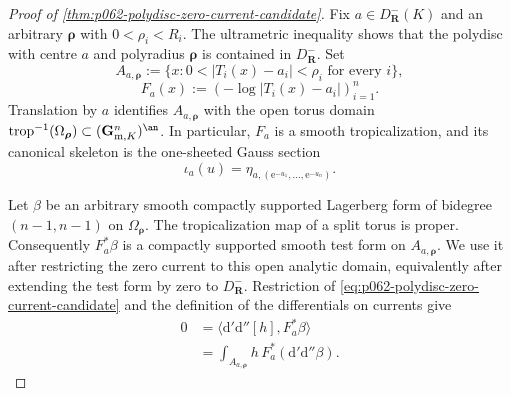 \begin{proof}[Proof of \cref{thm:p062-polydisc-zero-current-candidate}]
Fix \(a\in D^-_{\mathbf R}(K)\) and an arbitrary
\(\boldsymbol\rho\) with \(0<\rho_i<R_i\). The ultrametric inequality
shows that the polydisc with centre \(a\) and polyradius
\(\boldsymbol\rho\) is contained in \(D^-_{\mathbf R}\). Set
\[
 A_{a,\boldsymbol\rho}
 :=\bigl\{x:0<|T_i(x)-a_i|<\rho_i\text{ for every }i\bigr\},
\]
\[
 F_a(x):=(-\log|T_i(x)-a_i|)_{i=1}^n.
\]
Translation by \(a\) identifies \(A_{a,\boldsymbol\rho}\) with the open
torus domain
\(\operatorname{trop}^{-1}(\Omega_{\boldsymbol\rho})\subset
(\mathbf G_{\mathrm m,K}^n)^{\an}\). In particular, \(F_a\) is a smooth
tropicalization, and its canonical skeleton is the one-sheeted Gauss
section
\[
 \iota_a(u)=\eta_{a,(\mathrm e^{-u_1},\ldots,\mathrm e^{-u_n})}.
\]

Let \(\beta\) be an arbitrary smooth compactly supported Lagerberg form
of bidegree \((n-1,n-1)\) on
\(\Omega_{\boldsymbol\rho}\). The tropicalization map of a split torus is
proper. Consequently \(F_a^*\beta\) is a compactly supported smooth test
form on \(A_{a,\boldsymbol\rho}\). We use it after restricting the zero
current to this open analytic domain, equivalently after extending the
test form by zero to \(D^-_{\mathbf R}\). Restriction of
\eqref{eq:p062-polydisc-zero-current-candidate} and the definition of the
differentials on currents give
\begin{align}
 0
 &=\bigl\langle \mathrm d'\mathrm d''[h],F_a^*\beta\bigr\rangle \\
 &=\int_{A_{a,\boldsymbol\rho}}
          h\,F_a^*(\mathrm d'\mathrm d''\beta).
             \label{eq:p062-current-pulltest-candidate}
\end{align}


\end{proof}
